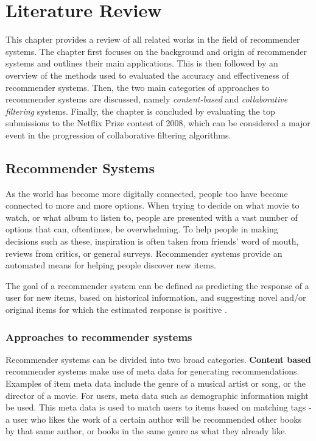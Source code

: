 \chapter{Literature Review}
\label{lit_review} %
This chapter provides a review of all related works in the field of recommender systems. The chapter first focuses on the background and origin of recommender systems and outlines their main applications. This is then followed by an overview of the methods used to evaluated the accuracy and effectiveness of recommender systems. Then, the two main categories of approaches to recommender systems are discussed, namely \textit{content-based} and \textit{collaborative filtering} systems. Finally, the chapter is concluded by evaluating the top submissions to the Netflix Prize contest of 2008, which can be considered a major event in the progression of collaborative filtering algorithms.

\section{Recommender Systems}
As the world has become more digitally connected, people too have become connected to more and more options. When trying to decide on what movie to watch, or what album to listen to, people are presented with a vast number of options that can, oftentimes, be overwhelming. To help people in making decisions such as these, inspiration is often taken from friends' word of mouth, reviews from critics, or general surveys. Recommender systems provide an automated means for helping people discover new items. \parencite{rs_1.1_Resnick}

The goal of a recommender system can be defined as predicting the response of a user for new items, based on historical information, and suggesting novel and/or original items for which the estimated response is positive \parencite{handbook_1.4_neighbourhood}.

\subsection{Approaches to recommender systems}
Recommender systems can be divided into two broad categories. \textbf{Content based} recommender systems make use of meta data for generating recommendations. Examples of item meta data include the genre of a musical artist or song, or the director of a movie. For users, meta data such as demographic information might be used. This meta data is used to match users to items based on matching tags - a user who likes the work of a certain author will be recommended other books by that same author, or books in the same genre as what they already like. \parencite{di2012linked}

